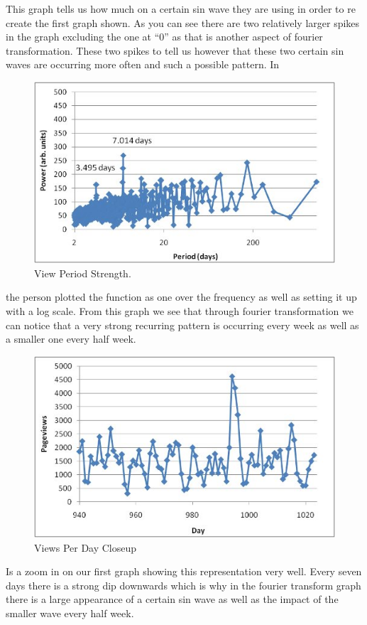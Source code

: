\documentclass [../article.tex]{subfiles}
\begin{document}
  This graph tells us how much on a certain sin wave they are
  using in order to re create the first graph shown. As you can
  see there are two relatively larger spikes in the graph
  excluding the one at “0” as that is another aspect of fourier
  transformation. These two spikes to tell us however that these
  two certain sin waves are occurring more often and such a
  possible pattern. In
  \begin{figure}[h!]
    \includegraphics[width=\linewidth]{../img/evar/3.jpg}
    \caption{View Period Strength.}
    \label{fig:viewperiods}
  \end{figure}
  the person plotted the function as one over the frequency as
  well as setting it up with a log scale. From this graph we see
  that through  fourier transformation we can notice that a very
  strong recurring pattern is occurring every week as well as a
  smaller one every half week.
  \begin{figure}[h!]
    \includegraphics[width=\linewidth]{../img/evar/4.jpg}
    \caption{Views Per Day Closeup}
    \label{fig:viewcloseup}
  \end{figure}
  Is a zoom in on our first graph showing this representation very
  well. Every seven days there is a strong dip downwards  which is
  why in the fourier transform graph there is a large appearance of
  a certain sin wave as well as the impact of the smaller wave every
  half week.
\end{document}
